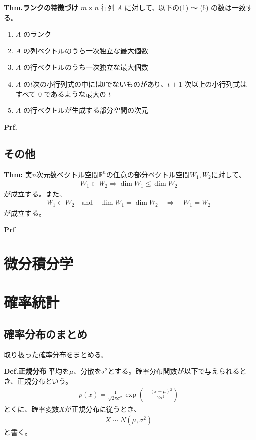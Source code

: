 \documentclass[a4paper,11pt]{jsarticle}
\numberwithin{equation}{section}
\begin{document}
\begin{itembox}[l]{\textbf{Thm.ランクの特徴づけ}}
  $m \times n$ 行列 $A$ に対して、以下の(1) 〜 (5) の数は一致する。
  \begin{enumerate}
      \item $A$ のランク
      \item $A$ の列ベクトルのうち一次独立な最大個数
      \item $A$ の行ベクトルのうち一次独立な最大個数
      \item $A$ の$t$次の小行列式の中には$0$でないものがあり、$t+1$ 次以上の小行列式はすべて $0$ であるような最大の $t$
      \item $A$ の行ベクトルが生成する部分空間の次元
  \end{enumerate}
\end{itembox}
\textbf{Prf.}\\



\subsection{その他}
\begin{itembox}[l]{\textbf{Thm:}}
  実$n$次元数ベクトル空間$\mathbb{R}^n$の任意の部分ベクトル空間$W_1, W_2$に対して、
  \begin{align}
    W_1 \subset W_2 \Rightarrow \dim W_1 \leq \dim W_2
  \end{align}
  が成立する。また、
  \begin{align}
    W_1 \subset W_2 \quad \text{and} \quad \dim W_1 = \dim W_2 \quad \Rightarrow \quad W_1 = W_2
  \end{align}
  が成立する。
\end{itembox}
\textbf{Prf}\\




\section{微分積分学}


\section{確率統計}
\subsection{確率分布のまとめ}
取り扱った確率分布をまとめる。\\
\begin{itembox}[l]{\textbf{Def.正規分布}}
  平均を$\mu$、分散を$\sigma^2$とする。確率分布関数が以下で与えられるとき、正規分布という。
  \begin{align}
    p(x) = \frac{1}{\sqrt{2\pi \sigma^2}} \exp\left(-\frac{(x-\mu)^2}{2\sigma^2}\right)
  \end{align}
  とくに、確率変数$X$が正規分布に従うとき、
  \begin{align}
    X \sim N(\mu,\sigma^2)
  \end{align}
  と書く。
\end{itembox}
\end{document}
